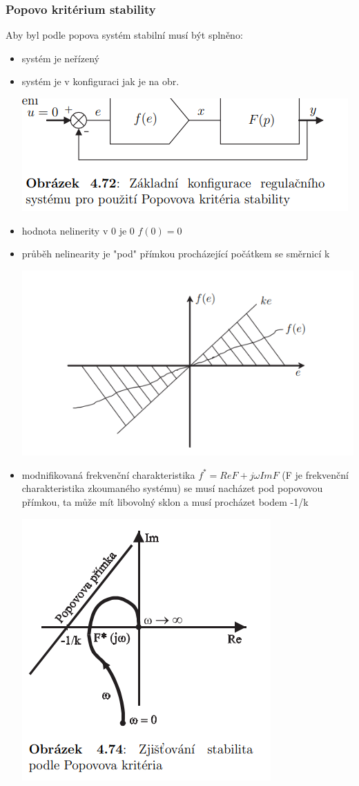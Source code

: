 \subsubsection{Popovo kritérium stability}
Aby byl podle popova systém stabilní musí být splněno:
\begin{itemize}
    \item systém je neřízený
    \item systém  je v konfiguraci jak je na obr.

          \includegraphics{img/popov.schem.png}
    \item hodnota nelinerity v 0 je 0 $f(0)=0$
    \item průběh nelinearity je "pod" přímkou procházející počátkem se směrnicí k

          \includegraphics{img/popov_nelilin.png}
    \item modnifikovaná frekvenční charakteristika $f^*=Re{F}+j\omega Im{F}$ (F je frekvenční charakteristika zkoumaného systému) se musí nacházet pod popovovou přímkou,
          ta může mít libovolný sklon a musí procházet bodem -1/k

          \includegraphics{img/popov_frek.png}
\end{itemize}
